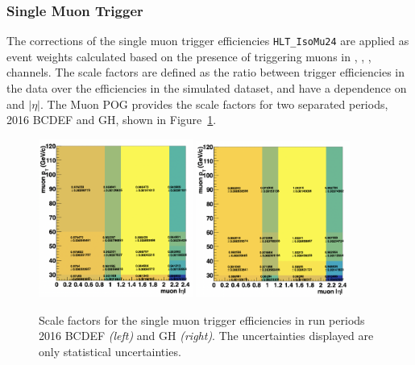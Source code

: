 \subsubsection{Single Muon Trigger}
The corrections of the single muon trigger efficiencies \texttt{HLT\_IsoMu24} are applied as event weights calculated based on the presence of triggering muons in \cme, \cmm, \cmt, \cmh channels. The scale factors are defined as the ratio between trigger efficiencies in the data over the efficiencies in the simulated dataset, and have a dependence on \pt and $|\eta|$. The Muon POG provides the scale factors for two separated periods, 2016 BCDEF and GH, shown in Figure~\ref{fig:analysis:calibration:mu24TriggerSF}.
\begin{figure}
    \centering
    \includegraphics[width=0.45\textwidth]{chapters/Analysis/sectionCalibration/figures/trigger/muTrSF_BCDEF.png}
    \includegraphics[width=0.45\textwidth]{chapters/Analysis/sectionCalibration/figures/trigger/muTrSF_GH.png}
    \caption{Scale factors for the single muon trigger efficiencies in run periods 2016 BCDEF \emph{(left)} and GH \emph{(right)}. The uncertainties displayed are only statistical uncertainties.}
    \label{fig:analysis:calibration:mu24TriggerSF}
\end{figure}






